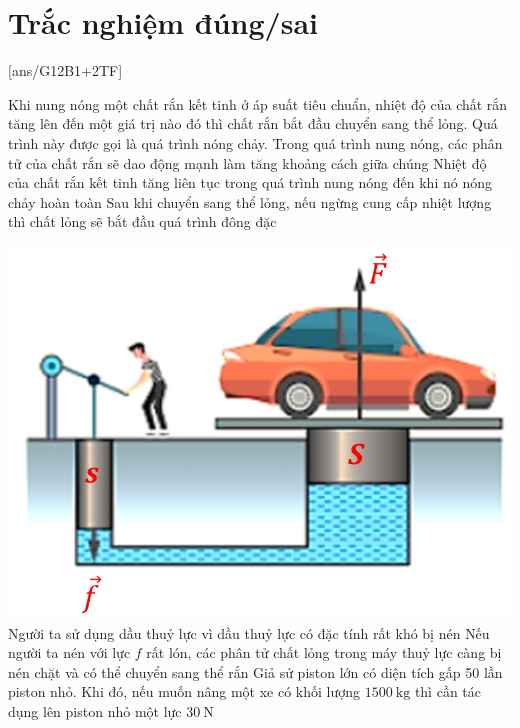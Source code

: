 \section{Trắc nghiệm đúng/sai}
\setcounter{ex}{0}
[ans/G12B1+2TF]
\begin{ex}
	Khi nung nóng một chất rắn kết tinh ở áp suất tiêu chuẩn, nhiệt độ của chất rắn tăng lên đến một giá trị nào đó thì chất rắn bắt đầu chuyển sang thể lỏng. Quá trình này được gọi là quá trình nóng chảy.
	{\True Trong quá trình nung nóng, các phân tử của chất rắn sẽ dao động mạnh làm tăng khoảng cách giữa chúng}
	{Nhiệt độ của chất rắn kết tinh tăng liên tục trong quá trình nung nóng đến khi nó nóng chảy hoàn toàn}
	{\True Sau khi chuyển sang thể lỏng, nếu ngừng cung cấp nhiệt lượng thì chất lỏng sẽ bắt đầu quá trình đông đặc}
	\loigiai{}
\end{ex}
\begin{ex}
{
\includegraphics[width=0.6\linewidth]{figs/G12-BT1+2-1}
}
	{Người ta sử dụng dầu thuỷ lực vì dầu thuỷ lực có đặc tính rất khó bị nén}
	{\True Nếu người ta nén với lực $f$ rất lón, các phân tử chất lỏng trong máy thuỷ lực càng bị nén chặt và có thể chuyển sang thể rắn}
	{Giả sử piston lớn có diện tích gấp 50 lần piston nhỏ. Khi đó, nếu muốn nâng một xe có khối lượng $\SI{1500}{\kilogram}$ thì cần tác dụng lên piston nhỏ một lực $\SI{30}{\newton}$}
\end{ex}
